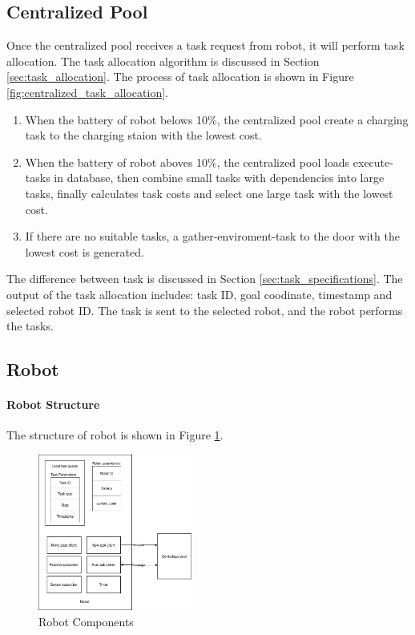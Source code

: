 \subsection{Centralized Pool}

Once the centralized pool receives a task request from robot, it will perform task allocation. The task allocation algorithm is discussed in Section \ref{sec:task_allocation}. The process of task allocation is shown in Figure \ref{fig:centralized_task_allocation}. 
\begin{enumerate}
	\item When the battery of robot belows 10\%, the centralized pool create a charging task to the charging staion with the lowest cost.
	\item When the battery of robot aboves 10\%, the centralized pool loads execute-tasks in database, then combine small tasks with dependencies into large tasks, finally calculates task costs and select one large task with the lowest cost. 
	\item If there are no suitable tasks, a gather-enviroment-task to the door with the lowest cost is generated. 
\end{enumerate}
The difference between task is discussed in Section \ref{sec:task_specifications}. The output of the task allocation includes: task ID, goal coodinate, timestamp and selected robot ID. The task is sent to the selected robot, and the robot performs the tasks.





\subsection{Robot}
\paragraph{Robot Structure} The structure of robot is shown in Figure \ref{fig:robot_components}. 

\begin{figure}[htbp]
	\centering
	\includegraphics[width = 0.45\textwidth]{content/images/ch4/system_component_robot.drawio.png}
	\caption{Robot Components}
	\label{fig:robot_components}
\end{figure}

